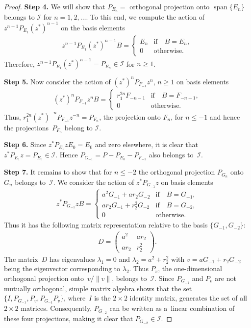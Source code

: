 \documentclass[11pt]{article}
\numberwithin{equation}{section}
\begin{document}
\begin{proof}
{\bf Step 4.} We will show that $P_{E_n}= $ orthogonal projection onto $\operatorname{span}\{E_n\}$ belongs to $\mathcal I$ for $n=1,2,
\dots$.
To this end, we compute the action of $z^{n-1} P_{E_1} (z^*)^{n-1}$ on the basis elements
\begin{gather*}
z^{n-1} P_{E_1} (z^*)^{n-1} B=
\begin{cases}
E_n & \text{if}\quad  B=E_n,
\\
0 & \text{otherwise.}
\end{cases}
\end{gather*}
Therefore, $z^{n-1} P_{E_1} (z^*)^{n-1}= P_{E_n} \in \mathcal I$ for $n \geq 1$.

{\bf Step 5.} Now consider the action of $(z^*)^n P_{F_{-1}} z^n$, $n \geq 1$ on basis elements
\begin{gather*}
(z^*)^n P_{F_{-1}} z^n B=
\begin{cases}
r_1^{2n}F_{-n-1} & \text{if}\quad  B=F_{-n-1},
\\
0 & \text{otherwise.}
\end{cases}
\end{gather*}
Thus, $r_1^{2n}(z^*)^{-n} P_{F_{-1}} z^{-n}= P_{F_n}$, the projection onto $F_n$, for $n \leq -1$ and hence the
projec\-tions~$P_{F_n}$ belong to $\mathcal I$.

{\bf Step 6.} Since $z^* P_{E_1}z E_0=E_0$ and zero elsewhere, it is clear that $z^* P_{E_1}z =P_{E_0} \in \mathcal I$.
Hence $P_{G_{-1}}= P- P_{E_0}- P_{F_{-1}}$ also belongs to~$\mathcal I$.

{\bf Step 7.} It remains to show that for $n \leq -2$ the orthogonal projection $P_{G_n}$ onto $G_n$ belongs to~$\mathcal I$.
We consider the action of $z^* P_{G_{-1}}z$ on basis elements
\begin{gather*}
z^* P_{G_{-1}}z B=
\begin{cases}
a^2 G_{-1}+ar_2G_{-2} & \text{if}\quad  B=G_{-1},
\\
ar_2 G_{-1}+r_2^2G_{-2} & \text{if}\quad  B= G_{-2},
\\
0 & \text{otherwise}.
\end{cases}
\end{gather*}
Thus it has the following matrix representation relative to the basis $\{G_{-1}, G_{-2}\}$:
\begin{gather*}
D=\left(
\begin{matrix}
a^2 & ar_2
\\
ar_2 & r_2^2
\end{matrix}
\right).
\end{gather*}
The matrix~$D$ has eigenvalues $\lambda_1=0$ and $\lambda_2= a^2+r_2^2$ with $v= aG_{-1}+ r_2 G_{-2}$ being the
eigenvector corresponding to $\lambda_2$.
Thus $P_{v}$, the one-dimensional orthogonal projection onto~$v/\|v\|$, belongs to~$\mathcal I$.
Since $P_{G_{-1}}$ and $P_{v}$ are not mutually orthogonal, simple matrix algebra shows that the set $\{I, P_{G_{-1}},
P_{v}, P_{G_{-1}}P_{v}\}$, where~$I$ is the $2 \times 2$ identity matrix, generates the set of all $2 \times 2 $
matrices.
Consequently, $P_{G_{-2}}$ can be written as a~linear combination of these four projections, making it clear that
$P_{G_{-2}} \in \mathcal I$.


\end{proof}
\end{document}
